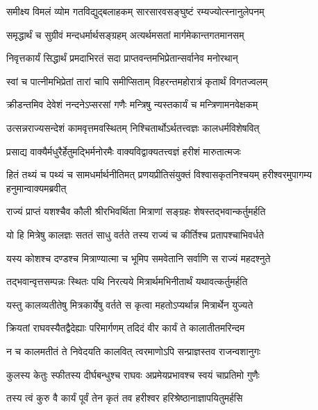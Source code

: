 \twolineshloka
{समीक्ष्य विमलं व्योम गतविद्युद्बलाहकम्}
{सारसारवसङ्घुष्टं रम्यज्योत्स्नानुलेपनम्} %

\twolineshloka
{समृद्धार्थं च सुग्रीवं मन्दधर्मार्थसङ्ग्रहम्}
{अत्यर्थमसतां मार्गमेकान्तगतमानसम्} %

\twolineshloka
{निवृत्तकार्यं सिद्धार्थं प्रमदाभिरतं सदा}
{प्राप्तवन्तमभिप्रेतान्सर्वानेव मनोरथान्} %

\twolineshloka
{स्वां च पात्नीमभिप्रेतां तारां चापि समीप्सिताम्}
{विहरन्तमहोरात्रं कृतार्थं विगतज्वलम्} %

\twolineshloka
{क्रीडन्तमिव देवेशं नन्दनेऽप्सरसां गणैः}
{मन्त्रिषु न्यस्तकार्यं च मन्त्रिणामनवेक्षकम्} %

\twolineshloka
{उत्सन्नराज्यसन्देशं कामवृत्तमवस्थितम्}
{निश्चितार्थोऽर्थतत्त्वज्ञः कालधर्मविशेषवित्} %

\twolineshloka
{प्रसाद्य वाक्यैर्मधुरैर्हेतुमद्भिर्मनोरमैः}
{वाक्यविद्वाक्यतत्त्वज्ञं हरीशं मारुतात्मजः} %

\threelineshloka
{हितं तथ्यं च पथ्यं च सामधर्मार्थनीतिमत्}
{प्रणयप्रीतिसंयुक्तं विश्वासकृतनिश्चयम्}
{हरीश्वरमुपागम्य हनुमान्वाक्यमब्रवीत्} %

\twolineshloka
{राज्यं प्राप्तं यशश्चैव कौली श्रीरभिवर्थिता}
{मित्राणां सङ्ग्रहः शेषस्तद्भवान्कर्तुमर्हति} %

\twolineshloka
{यो हि मित्रेषु कालज्ञः सततं साधु वर्तते}
{तस्य राज्यं च कीर्तिश्च प्रतापश्चाभिवर्धते} %

\twolineshloka
{यस्य कोशश्च दण्डश्च मित्राण्यात्मा च भूमिप}
{समवेतानि सर्वाणि स राज्यं महदश्नुते} %

\twolineshloka
{तद्भवान्वृत्तसम्पन्नः स्थितः पथि निरत्यये}
{मित्रार्थमभिनीतार्थं यथावत्कर्तुमर्हति} %

\twolineshloka
{यस्तु कालव्यतीतेषु मित्रकार्येषु वर्तते}
{स कृत्वा महतोऽप्यर्थान्न मित्रार्थेन युज्यते} %

\twolineshloka
{क्रियतां राघवस्यैतद्वैदेह्याः परिमार्गणम्}
{तदिदं वीर कार्यं ते कालातीतमरिन्दम} %

\twolineshloka
{न च कालमतीतं ते निवेदयति कालवित्}
{त्वरमाणोऽपि सन्प्राज्ञस्तव राजन्वशानुगः} %

\twolineshloka
{कुलस्य केतुः स्फीतस्य दीर्घबन्धुश्च राघवः}
{अप्रमेयप्रभावश्च स्वयं चाप्रतिमो गुणैः} %

\twolineshloka
{तस्य त्वं कुरु वै कार्यं पूर्वं तेन कृतं तव}
{हरीश्वर हरिश्रेष्ठानाज्ञापयितुमर्हसि} %


